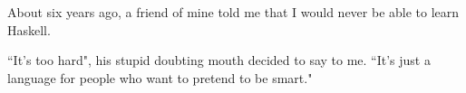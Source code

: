 \begin{foreword}
About six years ago, a friend of mine told me that I would never be able to learn Haskell.  

``It's too hard", his stupid doubting mouth decided to say to me.  ``It's just a language for people who want to pretend to be smart."

\end{foreword}

